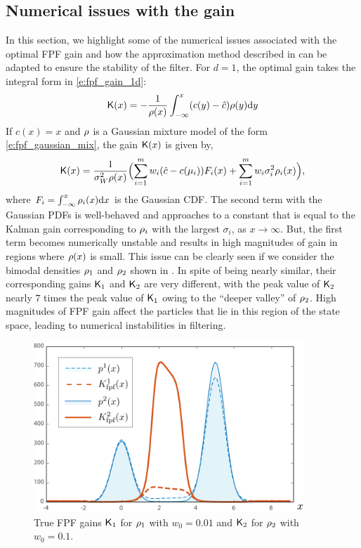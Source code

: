\subsection{Numerical issues with the gain}
\label{s:fpf_numerical}
In this section, we highlight some of the numerical issues associated with the optimal FPF gain and how the approximation method described in  can be adapted to ensure the stability of the filter. For $d=1$, the optimal gain takes the integral form in \eqref{e:fpf_gain_1d}:
\[
\text{\sf K}(x) = - \frac{1}{\rho(x)} \int_{-\infty}^{x} (c(y) - \hat{c}) \rho(y) \text{d} y
\]
If $c(x) = x$ and $\rho$ is a Gaussian mixture model of the form \eqref{e:fpf_gaussian_mix}, the gain $\text{\sf K}(x)$ is given by,
\begin{equation}
\kFPF(x) = \frac{1}{\sigma^2_W \pr(x)} \Bigl( \sum_{i=1}^m w_i (\hac - c(\mu_i)) F_i(x) + \sum_{i=1}^m w_i\sigma^2_i \pr_i(x)\Bigr),
\label{e:fpf_gain_gmm}
\end{equation}
where $F_i = \int_{-\infty}^{x} \rho_i(x) \text{d} x$ is the Gaussian CDF. The second term with the Gaussian PDFs is well-behaved and approaches to a constant that is equal to the Kalman gain corresponding to $\rho_i$ with the largest $\sigma_i$, as $x \to \infty$. But, the first term becomes numerically unstable and results in high magnitudes of gain in regions where $\rho(x)$ is small. This issue can be clearly seen if we consider the bimodal densities $\rho_1$ and $\rho_2$ shown in . In spite of being nearly similar, their corresponding gains $\text{\sf K}_1$ and $\text{\sf K}_2$ are very different, with the peak value of $\text{\sf K}_2$ nearly $7$ times the peak value of $\text{\sf K}_1$ owing to the ``deeper valley'' of $\rho_2$. High magnitudes of FPF gain affect the particles that lie in this region of the state space, leading to numerical instabilities in filtering.

\begin{figure}[htbp]
\centering
\includegraphics[width = 4in]{images/Chap4_Fig_gain_comparison}
	\caption{True FPF gains $\text{\sf K}_1$ for $\rho_1$ with $w_{0}=0.01$ and $\text{\sf K}_2$ for $\rho_2$ with $w_{0}=0.1$.}
	\label{fig:fpf_gain_num_issues}
\end{figure}

